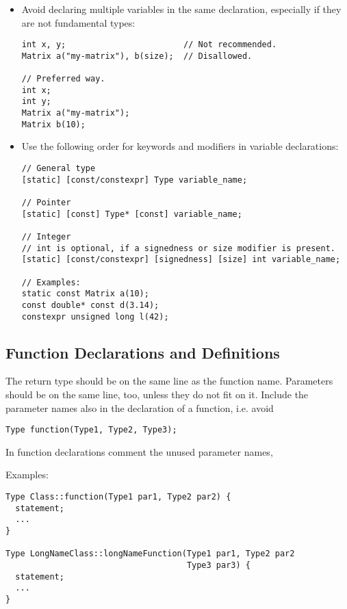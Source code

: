 \begin{itemize}

\item Avoid declaring multiple variables in the same declaration, especially if they are not fundamental types:

\begin{lstlisting}[showspaces=false]
int x, y;                        // Not recommended.
Matrix a("my-matrix"), b(size);  // Disallowed.

// Preferred way.
int x;
int y;
Matrix a("my-matrix");
Matrix b(10);
\end{lstlisting}

\item Use the following order for keywords and modifiers in  variable declarations:

\begin{lstlisting}[showspaces=false]
// General type
[static] [const/constexpr] Type variable_name;

// Pointer
[static] [const] Type* [const] variable_name;

// Integer
// int is optional, if a signedness or size modifier is present.
[static] [const/constexpr] [signedness] [size] int variable_name;

// Examples:
static const Matrix a(10);
const double* const d(3.14);
constexpr unsigned long l(42);
\end{lstlisting}

\end{itemize}

\subsection{Function Declarations and Definitions}

The return type should be on the same line as the function name.
Parameters should be on the same line, too, unless they do not fit on it.
Include the parameter names also in the declaration of a function, i.e. avoid
\begin{lstlisting}
Type function(Type1, Type2, Type3);
\end{lstlisting}
In function declarations comment the unused parameter names,\\

Examples:
\begin{lstlisting}
Type Class::function(Type1 par1, Type2 par2) {
  statement;
  ...
}

Type LongNameClass::longNameFunction(Type1 par1, Type2 par2
                                     Type3 par3) {
  statement;
  ...
}
\end{lstlisting}

